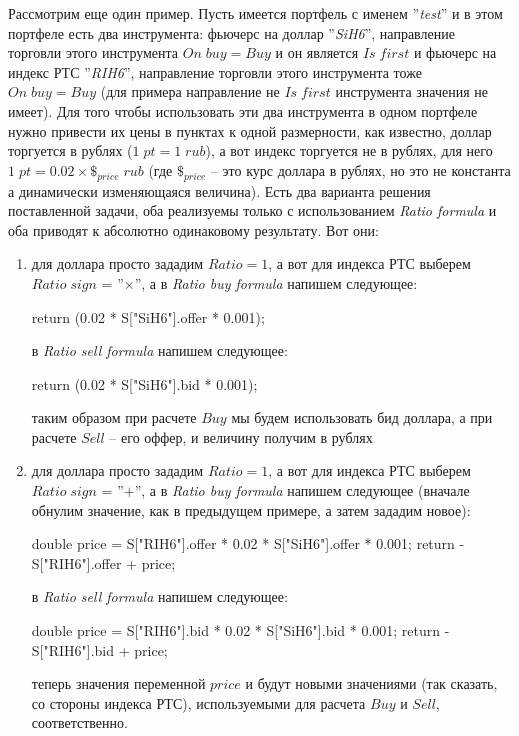 Рассмотрим еще один пример. Пусть имеется портфель с именем ''\textit{test}'' и в этом портфеле есть два инструмента: фьючерс на доллар ''\textit{SiH6}'',
направление торговли этого инструмента $On \; buy = Buy$ и он является $Is \; first$ и фьючерс на индекс РТС ''\textit{RIH6}'', направление торговли
этого инструмента тоже $On \; buy = Buy$ (для примера направление не $Is \; first$ инструмента значения не имеет). Для того чтобы использовать эти два
инструмента в одном портфеле нужно привести их цены в пунктах к одной размерности, как известно, доллар торгуется в рублях ($1 \;pt = 1 \; rub$), а вот
индекс торгуется не в рублях, для него $1 \;pt = 0.02 \times \$_{price} \; rub$ (где $\$_{price}$ -- это курс доллара в рублях, но это не константа а динамически
изменяющаяся величина). Есть два варианта решения поставленной задачи, оба реализуемы только с использованием \textit{Ratio formula} и оба приводят к
абсолютно одинаковому результату. Вот они:
\begin{enumerate}
	\item для доллара просто зададим $Ratio = 1$, а вот для индекса РТС выберем $Ratio \; sign$ = ''$\times$'', а в \textit{Ratio buy formula} напишем следующее:
	\begin{cpp}
return (0.02 * S["SiH6"].offer * 0.001);
	\end{cpp}
	в \textit{Ratio sell formula} напишем следующее:
	\begin{cpp}
return (0.02 * S["SiH6"].bid * 0.001);
	\end{cpp}
	таким образом при расчете $Buy$ мы будем использовать бид доллара, а при расчете $Sell$ -- его оффер, и величину получим в рублях
	\item для доллара просто зададим $Ratio = 1$, а вот для индекса РТС выберем $Ratio \; sign$ = ''$+$'', а в \textit{Ratio buy formula} напишем следующее
	(вначале обнулим значение, как в предыдущем примере, а затем зададим новое):
	\begin{cpp}
double price = S["RIH6"].offer * 0.02 * S["SiH6"].offer * 0.001;
return -S["RIH6"].offer + price;
	\end{cpp}
	в \textit{Ratio sell formula} напишем следующее:
	\begin{cpp}
double price = S["RIH6"].bid * 0.02 * S["SiH6"].bid * 0.001;
return -S["RIH6"].bid + price;
	\end{cpp}
	теперь значения переменной $price$ и будут новыми значениями (так сказать, со стороны индекса РТС), используемыми для расчета $Buy$ и $Sell$, соответственно.
\end{enumerate}
